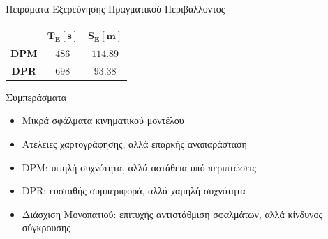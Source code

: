 \documentclass[10pt, compress, handout]{beamer} %
\begin{document}
\begin{frame}{Πειράματα Εξερεύνησης Πραγματικού Περιβάλλοντος}
	\begin{figure}
		\centering
		\captionsetup[subfigure]{labelformat=empty}
		\hspace{0.05\linewidth}
	\end{figure}	
	\bigskip

	\begin{table}[!ht]
		\centering
		\begin{tabular}{|c|c|c|}	\hline
			 & $\mathbf{T_E[s]}$ & $\mathbf{S_E[m]}$\\ \hline
			\textbf{DPM} & $486$ & $114.89$\\ \hline
			\textbf{DPR} & $698$ & $93.38$\\ \hline
		\end{tabular}
	\end{table}
\end{frame}

\begin{frame}{Συμπεράσματα}
	\begin{itemize}
		\item Μικρά σφάλματα κινηματικού μοντέλου
		\item Ατέλειες χαρτογράφησης, αλλά επαρκής αναπαράσταση
		\item DPM: υψηλή συχνότητα, αλλά αστάθεια υπό περιπτώσεις
		\item DPR: ευσταθής συμπεριφορά, αλλά χαμηλή συχνότητα
		\item Διάσχιση Μονοπατιού: επιτυχής αντιστάθμιση σφαλμάτων, αλλά κίνδυνος σύγκρουσης
	\end{itemize}
\end{frame}
\end{document}

